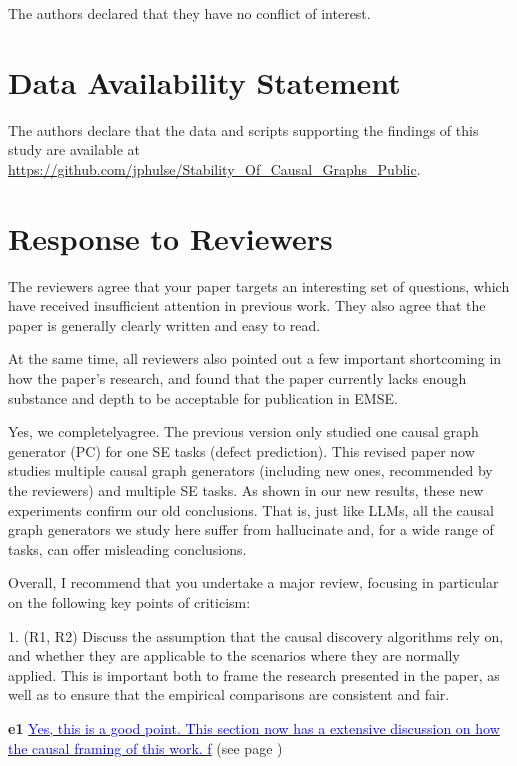\documentclass[]{svjour3}
\newif\ifblueresponse
\newcommand{\there}[2]{%
  \textbf{#1} \hyperlink{#1}{\textcolor{blue}{#2}} (see page \pageref{#1})%
}
\newcommand{\BLUE}{%
  \begingroup
  \ifblueresponse
    \color{blue}%
  \else
    \color{black}%
  \fi
}
\begin{document}
The authors declared that they have no conflict of interest.


\section*{Data Availability Statement}

The authors declare that the data and scripts supporting the findings of this study are available  at
\url{https://github.com/jphulse/Stability_Of_Causal_Graphs_Public}.

\newpage
{}
\setcounter{page}{1}

\section*{Response to Reviewers}

The reviewers agree that your paper targets an interesting set of questions, which have received insufficient attention in previous work. They also agree that the paper is generally clearly written and easy to read.

At the same time, all reviewers also pointed out a few important shortcoming in how the paper's research, and found that the paper currently lacks enough substance and depth to be acceptable for publication in EMSE.

\BLUE{Yes, we completelyagree. The previous version only studied one causal graph generator  (PC) for one SE tasks (defect prediction). This revised paper now studies multiple causal graph generators (including new ones,  recommended by the reviewers) and multiple SE tasks. As shown in our new results, these new experiments confirm
our old conclusions. That is, just like LLMs, all the causal graph generators we study here suffer from hallucinate and, for a wide range of tasks,  can offer misleading conclusions. } 

Overall, I recommend that you undertake a major review, focusing in particular on the following key points of criticism:

1. (R1, R2) Discuss the assumption that the causal discovery algorithms rely on, and whether they are applicable to the scenarios where they are normally applied. This is important both to frame the research presented in the paper, as well as to ensure that the empirical comparisons are consistent and fair.

\there{e1}{Yes, this is a good point. This section now has a extensive discussion on how the causal framing of this work. f}
\end{document}

